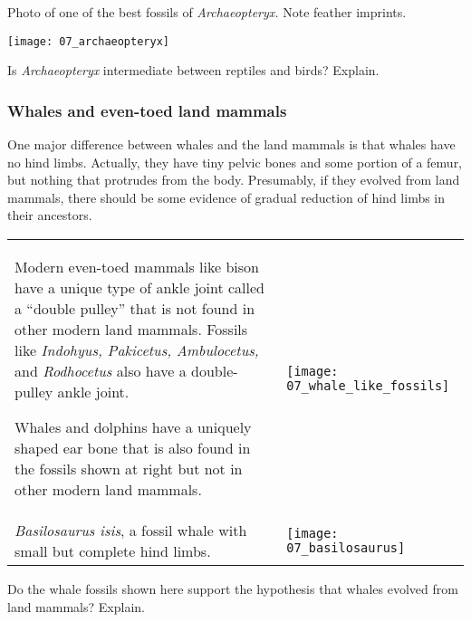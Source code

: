 \documentclass[12pt, hidelinks]{exam}
\begin{document}
\vspace*{\baselineskip}

Photo of one of the best fossils of \textit{Archaeopteryx.} Note feather imprints.

\begin{center}\texttt{[image: 07\_archaeopteryx]}\end{center}

\begin{questions}

\question[3]
Is \emph{Archaeopteryx} intermediate between reptiles and
birds? Explain. 

\newpage

\subsubsection*{Whales and even-toed land mammals}

One major difference between whales and the land
mammals is that whales have no hind limbs. Actually, they have tiny
pelvic bones and some portion of a femur, but nothing that protrudes
from the body. Presumably, if they evolved from land mammals, there
should be some evidence of gradual reduction of hind limbs in their
ancestors.

\begin{tabular}{@{}L{0.35\textwidth}R{0.6\textwidth}@{}}

Modern even-toed mammals like bison have a unique type of ankle joint called a ``double pulley'' that is not found in other modern land mammals. Fossils like \textit{Indohyus, Pakicetus, Ambulocetus,} and \textit{Rodhocetus} also have a double-pulley ankle joint. 

\vspace*{\baselineskip} 

Whales and dolphins have a uniquely shaped ear bone that is also found in the fossils shown at right but not in other modern land mammals. &

\texttt{[image: 07\_whale\_like\_fossils]}\\[\baselineskip]


\textit{Basilosaurus isis}, a fossil whale with small but complete hind
limbs. &
\texttt{[image: 07\_basilosaurus]} \\

\end{tabular}



\question[3]
Do the whale fossils shown here support the hypothesis that
whales evolved from land mammals? Explain.


\end{questions}
\end{document}
